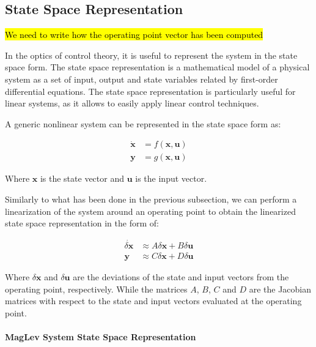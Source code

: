 \subsection{State Space Representation}
\label{subsec:state_space_representation}

\hl{We need to write how the operating point vector has been computed}

In the optics of control theory, it is useful to represent the system in the state space form.
The state space representation is a mathematical model of a physical system as a set of input, output and state variables related by first-order differential equations.
The state space representation is particularly useful for linear systems, as it allows to easily apply linear control techniques.

A generic nonlinear system can be represented in the state space form as:

\begin{equation}
    \begin{aligned}
        \dot{\mathbf{x}} & = f(\mathbf{x}, \mathbf{u}) \\
        \mathbf{y}       & = g(\mathbf{x}, \mathbf{u})
    \end{aligned}
\end{equation}

Where $\mathbf{x}$ is the state vector and $\mathbf{u}$ is the input vector.

Similarly to what has been done in the previous subsection, we can perform a linearization of the system around an operating point to obtain the linearized state space representation in the form of:

\begin{equation}
    \begin{aligned}
        \dot{\delta\mathbf{x}} & \approx A \delta\mathbf{x} + B \delta\mathbf{u} \\
        \mathbf{y}             & \approx C \delta\mathbf{x} + D \delta\mathbf{u}
    \end{aligned}
\end{equation}

Where $\delta\mathbf{x}$ and $\delta\mathbf{u}$ are the deviations of the state and input vectors from the operating point, respectively.
While the matrices $A$, $B$, $C$ and $D$ are the Jacobian matrices with respect to the state and input vectors evaluated at the operating point.

\paragraph{MagLev System State Space Representation}

